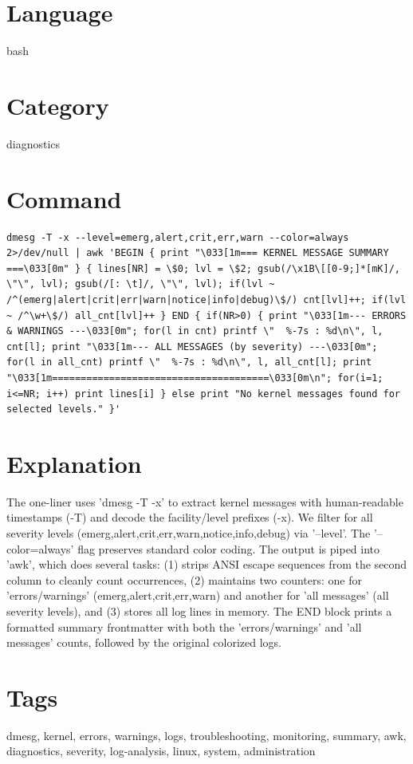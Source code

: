 \documentclass[openany]{book}
\begin{document}
\section*{Language}
bash

\section*{Category}
diagnostics

\section*{Command}
\begin{lstlisting}
dmesg -T -x --level=emerg,alert,crit,err,warn --color=always 2>/dev/null | awk 'BEGIN { print "\033[1m=== KERNEL MESSAGE SUMMARY ===\033[0m" } { lines[NR] = \$0; lvl = \$2; gsub(/\x1B\[[0-9;]*[mK]/, \"\", lvl); gsub(/[: \t]/, \"\", lvl); if(lvl ~ /^(emerg|alert|crit|err|warn|notice|info|debug)\$/) cnt[lvl]++; if(lvl ~ /^\w+\$/) all_cnt[lvl]++ } END { if(NR>0) { print "\033[1m--- ERRORS & WARNINGS ---\033[0m"; for(l in cnt) printf \"  %-7s : %d\n\", l, cnt[l]; print "\033[1m--- ALL MESSAGES (by severity) ---\033[0m"; for(l in all_cnt) printf \"  %-7s : %d\n\", l, all_cnt[l]; print "\033[1m======================================\033[0m\n"; for(i=1; i<=NR; i++) print lines[i] } else print "No kernel messages found for selected levels." }'
\end{lstlisting}

\section*{Explanation}
The one-liner uses 'dmesg -T -x' to extract kernel messages with human-readable timestamps (-T) and decode the facility/level prefixes (-x). We filter for all severity levels (emerg,alert,crit,err,warn,notice,info,debug) via '--level'. The '--color=always' flag preserves standard color coding. The output is piped into 'awk', which does several tasks: (1) strips ANSI escape sequences from the second column to cleanly count occurrences, (2) maintains two counters: one for 'errors/warnings' (emerg,alert,crit,err,warn) and another for 'all messages' (all severity levels), and (3) stores all log lines in memory. The END block prints a formatted summary frontmatter with both the 'errors/warnings' and 'all messages' counts, followed by the original colorized logs.

\section*{Tags}
dmesg, kernel, errors, warnings, logs, troubleshooting, monitoring, summary, awk, diagnostics, severity, log-analysis, linux, system, administration
\end{document}
